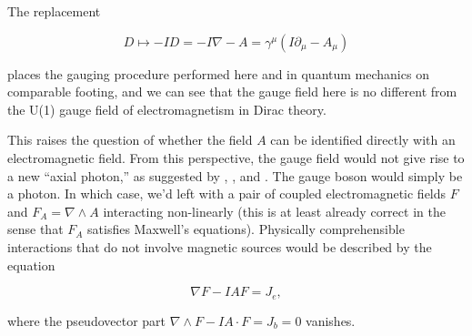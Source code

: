 \documentclass{article}
\begin{document}
  The replacement 

  \begin{equation}
    D \mapsto - I D = -I \nabla - A = \gamma^\mu (I \partial_\mu - A_\mu)
  \end{equation}

  places the gauging procedure performed here and in quantum mechanics on comparable footing, and we can see that the gauge field here is no different from the U(1) gauge field of electromagnetism in Dirac theory.

  This raises the question of whether the field $A$ can be identified directly with an electromagnetic field. From this perspective, the gauge field would not give rise to a new ``axial photon,'' as suggested by \cite{malik}, \cite{naik}, and \cite{pmn}. The gauge boson would simply be a photon. In which case, we'd left with a pair of coupled electromagnetic fields $F$ and $F_A = \nabla \wedge A$ interacting non-linearly (this is at least already correct in the sense that $F_A$ satisfies Maxwell's equations). Physically comprehensible interactions that do not involve magnetic sources would be described by the equation

  \begin{equation}
    \nabla F - I A F = J_e,
  \end{equation}

  where the pseudovector part $\nabla \wedge F - I A \cdot F = J_b = 0$ vanishes.
\end{document}
